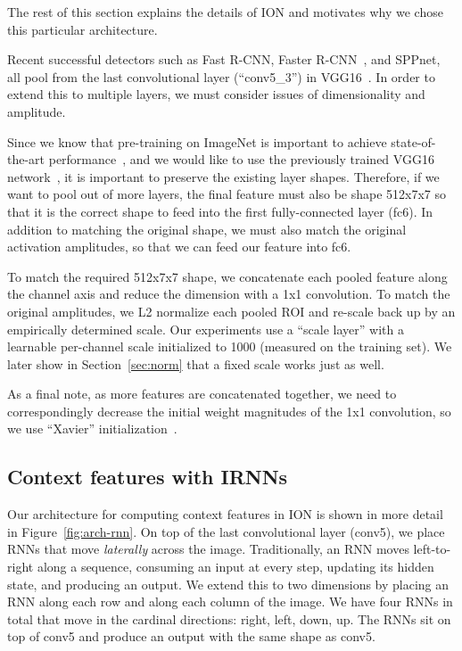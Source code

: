 \documentclass[10pt,twocolumn,letterpaper]{article}
\begin{document}
The rest of this section explains the details of ION and motivates why we chose
this particular architecture.


Recent successful detectors such as Fast R-CNN, Faster
R-CNN~\cite{ren2015faster}, and SPPnet, all pool from the last convolutional
layer (``conv5\_3'') in VGG16~\cite{simonyan2015verydeep}.  In order to extend
this to multiple layers, we must consider issues of dimensionality and
amplitude.

Since we know that pre-training on ImageNet is important to achieve
state-of-the-art performance~\cite{agrawal14analyzing}, and we would like to use
the previously trained VGG16 network~\cite{simonyan2015verydeep}, it is
important to preserve the existing layer shapes.  Therefore, if we want to pool
out of more layers, the final feature must also be shape 512x7x7 so that it is
the correct shape to feed into the first fully-connected layer (fc6).  In
addition to matching the original shape, we must also match the original
activation amplitudes, so that we can feed our feature into fc6.

To match the required 512x7x7 shape, we concatenate each pooled feature along
the channel axis and reduce the dimension with a 1x1 convolution.  To match the
original amplitudes, we L2 normalize each pooled ROI and re-scale back up by an
empirically determined scale.  Our experiments use a ``scale layer'' with a
learnable per-channel scale initialized to 1000 (measured on the training set).
We later show in Section~\ref{sec:norm} that a fixed scale works just as well.


As a final note, as more features are concatenated together, we need to
correspondingly decrease the initial weight magnitudes of the 1x1 convolution,
so we use ``Xavier'' initialization~\cite{glorot10}.

\subsection{Context features with IRNNs}

Our architecture for computing context features in ION is shown in more detail in
Figure~\ref{fig:arch-rnn}.  On top of the last convolutional layer (conv5),
we place RNNs that move \emph{laterally} across the image.  Traditionally, an
RNN moves left-to-right along a sequence, consuming an input at every step,
updating its hidden state, and producing an output.  We extend this to two
dimensions by placing an RNN along each row and along each column of the
image.  We have four RNNs in total that move in the cardinal directions: right,
left, down, up.  The RNNs sit on top of conv5 and produce an output with the
same shape as conv5.
\end{document}
